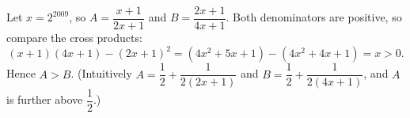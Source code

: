 Let $x=2^{2009}$, so $A=\dfrac{x+1}{2x+1}$ and $B=\dfrac{2x+1}{4x+1}$. Both denominators are positive, so compare the cross products:
\[
(x+1)(4x+1)-(2x+1)^2=\left(4x^2+5x+1\right)-\left(4x^2+4x+1\right)=x>0 .
\]
Hence $\boxed{A>B}$. (Intuitively $A=\dfrac{1}{2}+\dfrac{1}{2(2x+1)}$ and $B=\dfrac{1}{2}+\dfrac{1}{2(4x+1)}$, and $A$ is further above $\dfrac{1}{2}$.)
